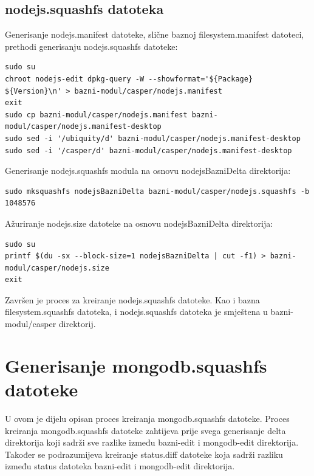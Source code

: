 \documentclass[12pt,vi]{mitthesis}
\begin{document}
\subsection*{nodejs.squashfs datoteka}
\indent
Generisanje nodejs.manifest datoteke, slične baznoj filesystem.manifest datoteci, prethodi generisanju nodejs.squashfs datoteke:
\begin{lstlisting}[style=BashInputStyle]
sudo su
chroot nodejs-edit dpkg-query -W --showformat='${Package} ${Version}\n' > bazni-modul/casper/nodejs.manifest
exit
sudo cp bazni-modul/casper/nodejs.manifest bazni-modul/casper/nodejs.manifest-desktop
sudo sed -i '/ubiquity/d' bazni-modul/casper/nodejs.manifest-desktop
sudo sed -i '/casper/d' bazni-modul/casper/nodejs.manifest-desktop
\end{lstlisting}
\indent
Generisanje nodejs.squashfs modula na osnovu nodejsBazniDelta direktorija:
\begin{lstlisting}[style=BashInputStyle]
sudo mksquashfs nodejsBazniDelta bazni-modul/casper/nodejs.squashfs -b 1048576
\end{lstlisting}
\noindent
Ažuriranje nodejs.size datoteke na osnovu nodejsBazniDelta direktorija:
\begin{lstlisting}[style=BashInputStyle]
sudo su
printf $(du -sx --block-size=1 nodejsBazniDelta | cut -f1) > bazni-modul/casper/nodejs.size
exit
\end{lstlisting}
Završen je proces za kreiranje nodejs.squashfs datoteke. Kao i bazna filesystem.squashfs datoteka, i nodejs.squashfs datoteka je smještena u bazni-modul/casper direktorij.
\section*{Generisanje mongodb.squashfs datoteke}
\indent
U ovom je dijelu opisan proces kreiranja mongodb.squashfs datoteke. Proces kreiranja mongodb.squashfs datoteke zahtijeva prije svega generisanje delta direktorija koji sadrži sve razlike između bazni-edit i mongodb-edit direktorija. Također se podrazumijeva kreiranje status.diff datoteke koja sadrži razliku između status datoteka bazni-edit i mongodb-edit direktorija.\\
\end{document}
